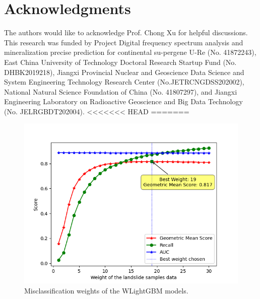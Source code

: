 \documentclass[a4paper,fleqn]{cas-sc}
\begin{document}
\section{Acknowledgments}

The authors would like to acknowledge Prof. Chong Xu for helpful discussions. 
This research was funded by Project Digital frequency spectrum analysis and mineralization precise prediction for continental su-pergene U-Re (No. 41872243), East China University of Technology Doctoral Research Startup Fund (No. DHBK2019218), Jiangxi Provincial Nuclear and Geoscience Data Science and System Engineering Technology Research Center (No.JETRCNGDSS202002), National Natural Science Foundation of China (No. 41807297), and Jiangxi Engineering Laboratory on Radioactive Geoscience and Big Data Technology (No. JELRGBDT202004).
<<<<<<< HEAD
=======

\begin{figure}
  \centering
  \includegraphics[width=12cm]{Definitions/Fig_Weight_LGBM.png}
  \caption{Misclassification weights of the WLightGBM models.}
  \label{Fig_Weight}
\end{figure}
\end{document}
